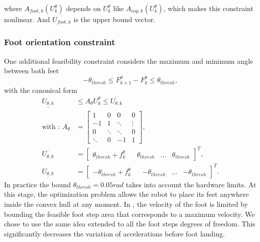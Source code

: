 where $A_{foot,k}(U^\theta_k)$ depends on $U_k^{\theta}$ like $A_{cop,k}(U_k^\theta)$, which makes this constraint nonlinear.
And $\overline{U_{foot,k}}$ is the upper bound vector.%


\subsubsection{Foot orientation constraint}
\label{Sec:constraintOnFootOrientation}

One additional feasibility constraint considers the maximum and minimum angle between both feet
\begin{equation}
    -\theta_{thresh} \leq F_{k+1}^\theta - F_{k}^\theta \leq \theta_{thresh} \label{eq:ori_constraint}
    ,
\end{equation}
with the canonical form
\begin{align}
    \underline{U_{\theta,k}} &\leq A_{\theta} U_k^\theta \leq \overline{U_{\theta,k}} \\
    \label{eq:thetaCanonicConstraint}
\text{with : }    A_{\theta} &=
    \begin{bmatrix}
    		 1 &  0 & 0 & 0 \\
    		-1 &  1 & \ddots & \vdots \\
      	 0 & \ddots & \ddots & 0  \\
    		 \ddots & 0 & -1 & 1
    	\end{bmatrix}, \nonumber\\
    \overline{U_{\theta,k}} &=
    	\begin{bmatrix}
    		 \theta_{thresh} + f_k^{\theta} & &
    		 \theta_{thresh} &
    		 \hdots &
    		 \theta_{thresh}
    	\end{bmatrix}^T , \nonumber \\
    \underline{U_{\theta,k}} &=
    	\begin{bmatrix}
    		 -\theta_{thresh} + f_k^{\theta} & &
    		 -\theta_{thresh} &
    		 \hdots &
    		 -\theta_{thresh}
    	\end{bmatrix}^T \nonumber
        .
\end{align}
In practice the bound $\theta_{thresh} = 0.05rad$ takes into account the hardware limits.
At this stage, the optimization problem allows the robot to place its feet anywhere inside the convex hull at any moment.
In \cite{herdt:iros:2010}, the velocity of the foot is limited by bounding the feasible foot step area that corresponds to a maximum velocity.
We chose to use the same idea extended to all the foot steps degrees of freedom.
This significantly decreases the variation of accelerations before foot landing.

